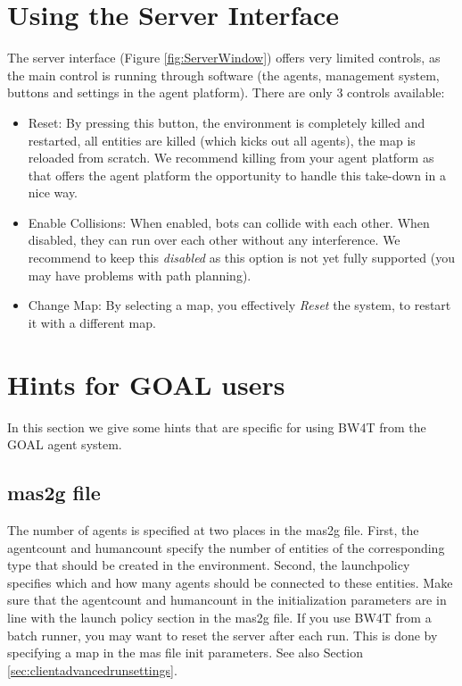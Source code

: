 \documentclass[11pt,a4paper]{article}
\begin{document}
\section{Using the Server Interface}
The server interface (Figure \ref{fig:ServerWindow}) offers very limited controls, as the main control is running through software (the agents, management system, buttons and settings in the agent platform). There are only 3 controls available:
\begin{itemize}
\item{Reset}: By pressing this button, the environment is completely killed and restarted, all entities are killed (which kicks out all agents), the map is reloaded from scratch. We recommend killing from your agent platform as that offers the agent platform the opportunity to handle this take-down in a nice way.
\item{Enable Collisions}: When enabled, bots can collide with each other. When disabled, they can run over each other without any interference. We recommend to keep this \emph{disabled} as this option is not yet fully supported (you may have problems with path planning).
\item{Change Map}: By selecting a map, you effectively \emph{Reset} the system, to restart it with a different map.
\end{itemize}








\section{Hints for GOAL users}
In this section we give some hints that are specific for using BW4T from the GOAL agent system.

\subsection{mas2g file}
The number of agents is specified at two places in the mas2g file. First, the agentcount and humancount specify the number of entities of the corresponding type that should be created in the environment. Second, the launchpolicy specifies which and how many agents should be connected to these entities. Make sure that the agentcount and humancount in the initialization parameters are in line with the launch policy section in the mas2g file. 
If you use BW4T from a batch runner, you may want to reset the server after each run. This is done by specifying a map in the mas file init parameters. See also Section \ref{sec:clientadvancedrunsettings}.
\end{document}
